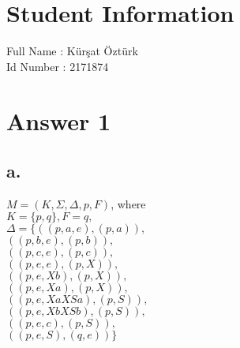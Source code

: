 \documentclass[12pt]{article}
\begin{document}
\section*{Student Information } 
Full Name :  Kürşat Öztürk\\
Id Number :  2171874\\

\section*{Answer 1}

\subsection*{a.}
$M=(K, \Sigma, \Delta, p, F)$, where \\
$K=\{p,q\}, F= {q}, $\\
$\Delta = \{ ((p,a,e),(p,a)),$\\
$((p,b,e),(p,b)),$ \\
$((p,c,e),(p,c)),$ \\
$((p,e,e),(p,X)),$ \\
$((p,e,Xb),(p,X)),$ \\
$((p,e,Xa),(p,X)),$ \\
$((p,e,XaXSa),(p,S)),$ \\
$((p,e,XbXSb),(p,S)),$ \\
$((p,e,c),(p,S)),$ \\
$((p,e,S),(q,e)) \}$ \\
\end{document}
